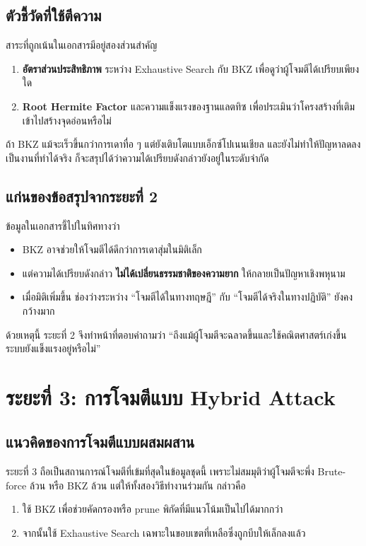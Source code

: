 \documentclass[12pt,a4paper]{article}
\newcommand{\term}[1]{\textbf{#1}}
\newcommand{\eng}[1]{\textenglish{#1}}
\begin{document}
	\subsection{ตัวชี้วัดที่ใช้ตีความ}
	
	สาระที่ถูกเน้นในเอกสารมีอยู่สองส่วนสำคัญ
	\begin{enumerate}[label=\arabic*.]
		\item \term{อัตราส่วนประสิทธิภาพ} ระหว่าง \eng{Exhaustive Search} กับ \eng{BKZ} เพื่อดูว่าผู้โจมตีได้เปรียบเพียงใด
		\item \term{Root Hermite Factor} และความแข็งแรงของฐานแลตทิซ เพื่อประเมินว่าโครงสร้างที่เติมเข้าไปสร้างจุดอ่อนหรือไม่
	\end{enumerate}
	
	ถ้า \eng{BKZ} แม้จะเร็วขึ้นกว่าการเดาทื่อ ๆ แต่ยังเติบโตแบบเอ็กซ์โปเนนเชียล และยังไม่ทำให้ปัญหาลดลงเป็นงานที่ทำได้จริง ก็จะสรุปได้ว่าความได้เปรียบดังกล่าวยังอยู่ในระดับจำกัด
	
	\subsection{แก่นของข้อสรุปจากระยะที่ 2}
	
	ข้อมูลในเอกสารชี้ไปในทิศทางว่า
	\begin{itemize}
		\item \eng{BKZ} อาจช่วยให้โจมตีได้ดีกว่าการเดาสุ่มในมิติเล็ก
		\item แต่ความได้เปรียบดังกล่าว \term{ไม่ได้เปลี่ยนธรรมชาติของความยาก} ให้กลายเป็นปัญหาเชิงพหุนาม
		\item เมื่อมิติเพิ่มขึ้น ช่องว่างระหว่าง ``โจมตีได้ในทางทฤษฎี'' กับ ``โจมตีได้จริงในทางปฏิบัติ'' ยังคงกว้างมาก
	\end{itemize}
	
	ด้วยเหตุนี้ ระยะที่ 2 จึงทำหน้าที่ตอบคำถามว่า ``ถึงแม้ผู้โจมตีจะฉลาดขึ้นและใช้คณิตศาสตร์เก่งขึ้น ระบบยังแข็งแรงอยู่หรือไม่''
	
	\section{ระยะที่ 3: การโจมตีแบบ Hybrid Attack}
	
	\subsection{แนวคิดของการโจมตีแบบผสมผสาน}
	
	ระยะที่ 3 ถือเป็นสถานการณ์โจมตีที่เข้มที่สุดในข้อมูลชุดนี้ เพราะไม่สมมุติว่าผู้โจมตีจะพึ่ง \eng{Brute-force} ล้วน หรือ \eng{BKZ} ล้วน แต่ให้ทั้งสองวิธีทำงานร่วมกัน กล่าวคือ
	\begin{enumerate}[label=\arabic*.]
		\item ใช้ \eng{BKZ} เพื่อช่วยคัดกรองหรือ \eng{prune} พิกัดที่มีแนวโน้มเป็นไปได้มากกว่า
		\item จากนั้นใช้ \eng{Exhaustive Search} เฉพาะในขอบเขตที่เหลือซึ่งถูกบีบให้เล็กลงแล้ว
	\end{enumerate}
	
\end{document}
